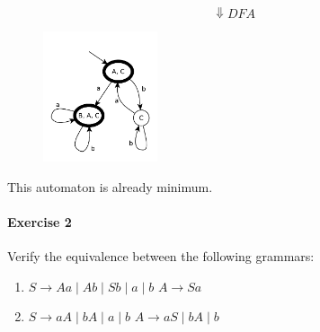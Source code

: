 $$
    \Downarrow DFA
$$
\begin{figure}[H]
    \centerline{\includegraphics[width=0.3\textwidth]{img/43.pdf}}
\end{figure}
This automaton is already minimum.

\paragraph{Exercise 2}
Verify the equivalence between the following grammars:
\begin{enumerate}
    \item
    $S \to Aa \; | \; Ab \; | \; Sb \; | \; a \; | \; b$ \newline
    $A \to Sa$
    \item
    $S \to aA \; | \; bA \; | \; a \; | \; b$ \newline
    $A \to aS \; | \; bA \; | \; b$
\end{enumerate}

